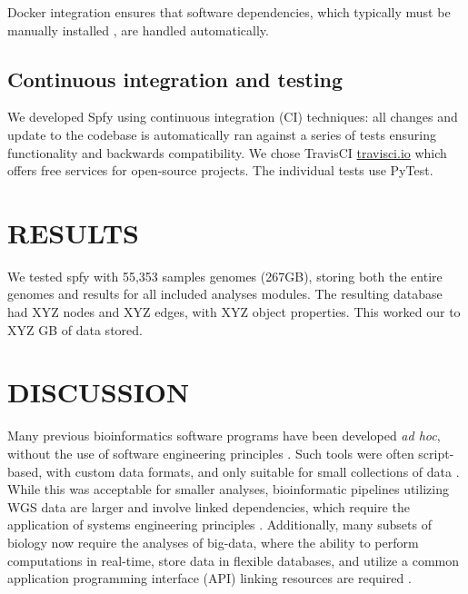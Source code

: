 \documentclass[a4,center,fleqn]{NAR}
\begin{document}
Docker integration ensures that software dependencies, which typically must be manually installed \cite{doi:10.1093/bioinformatics/btu153,laing2010pan,inouye2014srst2,naccache2014cloud}, are handled automatically.


\subsection{Continuous integration and testing}

We developed Spfy using continuous integration (CI) techniques: all changes and update to the codebase is automatically ran against a series of tests ensuring functionality and backwards compatibility.
We chose TravisCI \url{travisci.io} which offers free services for open-source projects.
The individual tests use PyTest.


\section{RESULTS}

We tested spfy with 55,353 samples genomes (267GB), storing both the entire genomes and results for all included analyses modules.
The resulting database had XYZ nodes and XYZ edges, with XYZ object properties.
This worked our to XYZ GB of data stored.



\section{DISCUSSION}

Many previous bioinformatics software programs have been developed \textit{ad hoc}, without the use of software engineering principles \cite{de2015trends}.
Such tools were often script-based, with custom data formats, and only suitable for small collections of data \cite{de2015trends}.
While this was acceptable for smaller analyses, bioinformatic pipelines utilizing WGS data are larger and involve linked dependencies, which require the application of systems engineering principles \cite{schatz2015biological}.
Additionally, many subsets of biology now require the analyses of big-data, where the ability to perform computations in real-time, store data in flexible databases, and utilize a common application programming interface (API) linking resources are required \cite{swaminathan2016review}.
\end{document}
